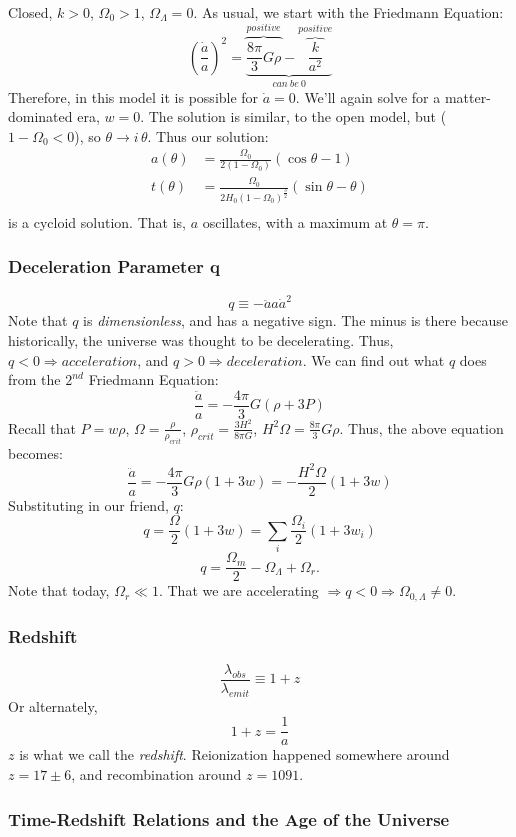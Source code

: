 \documentclass{article}
\def\imply{\Rightarrow}
\def\aa{\frac{\dot a }{ a}}
\def\adda{\frac{\ddot a}{ a}}
\def\etot{\Omega_0}
\def\econs{\Omega_{0,\Lambda}}
\def\econs{\Omega_{0,\Lambda}}
\def\epot{\frac{8\pi}{ 3}}
\def\imply{\Rightarrow}
\def\etot{\Omega_0}
\def\econs{\Omega_{0,\Lambda}}
\def\econs{\Omega_{0,\Lambda}}
\def\rcr{{\rho_{crit}}}
\begin{document}
Closed, $k>0$, $\etot>1$, $\Omega_\Lambda=0$. As usual,
we start with the Friedmann Equation:
$$(\aa)^2 = \underbrace{\overbrace{\epot G\rho}^{positive} - 
\overbrace{\frac{k}{ a^2}}^{positive}}_{can\ be\ 0}$$
Therefore, in this model it is possible for $\dot a=0$.  We'll again solve for a
matter-dominated era, $w=0$.  The solution is similar, to the open model, 
but ($1-\etot<0$), so $\theta\to i\,\theta$. Thus our solution:
\begin{align}a(\theta)&=\frac{\etot}{ 2(1-\etot)}(\cos\theta-1)\\
t(\theta)&=\frac{\etot}{2H_0(1-\etot)^\frac{3}{ 2}}(\sin\theta-\theta)\\
\end{align}
is a cycloid solution.  That is, $a$ oscillates, with a maximum at 
$\theta=\pi$.

\subsubsection{ Deceleration Parameter q}

$$q\equiv-{\ddot aa}{ \dot a^2}$$
Note that $q$ is {\it dimensionless}, and has a negative sign.  The minus is
there because historically, the universe was thought to be decelerating.  Thus,
$q<0\imply acceleration$, and $q>0\imply deceleration$.  We can find out what
$q$ does from the $2^{nd}$ Friedmann Equation:
$$\adda=-\frac{4\pi}{3}G(\rho+3P)$$
Recall that $P=w\rho$, $\Omega=\frac{\rho}{\rcr}$,
$\rcr=\frac{3H^2}{8\pi G}$, $H^2\Omega=\epot G\rho$. Thus, the
above equation becomes:
$$\adda=-\frac{4\pi}{3}G\rho(1+3w)=-\frac{H^2\Omega}{2}(1+3w)$$
Substituting in our friend, $q$:
$$q=\frac{\Omega}{2}(1+3w)=\sum_i{\frac{\Omega_i}{2}(1+3w_i)}$$
$$\boxed{q = \frac{\Omega _m }{ 2} - \Omega _\Lambda +\Omega _r}.$$
Note that today, $\Omega_r\ll1$.  That we are accelerating $\imply q<0
\imply\econs\ne0$.

\subsubsection{ Redshift }

$$\frac{\lambda_{obs} }{ \lambda_{emit}} \equiv 1 + z$$
Or alternately,
$$\boxed{1 + z = \frac{1}{ a}}$$
$z$ is what we call the {\it redshift}. Reionization happened somewhere
around $z=17\pm6$, and recombination around $z=1091$.

\subsubsection{ Time-Redshift Relations and the Age of the Universe }
\end{document}
